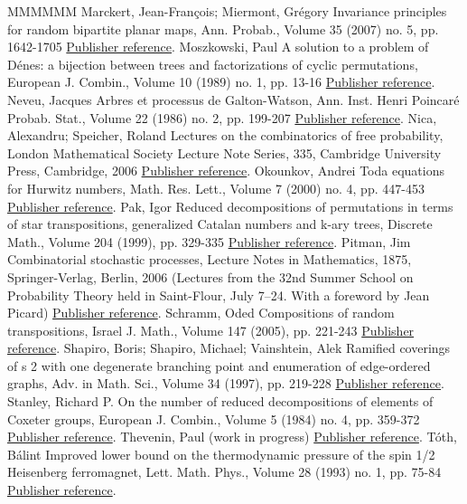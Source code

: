 \begin{thebibliography}{MMMMMM}
 Marckert, Jean-François; Miermont, Grégory Invariance principles for random bipartite planar maps, Ann. Probab., Volume 35 (2007) no. 5, pp. 1642-1705 \href{https://ahl.centre-mersenne.org/item/AHL_2018__1__149_0/#MM07}{Publisher reference}.
 Moszkowski, Paul A solution to a problem of Dénes: a bijection between trees and factorizations of cyclic permutations, European J. Combin., Volume 10 (1989) no. 1, pp. 13-16 \href{https://ahl.centre-mersenne.org/item/AHL_2018__1__149_0/#Mos89}{Publisher reference}.
 Neveu, Jacques Arbres et processus de Galton-Watson, Ann. Inst. Henri Poincaré Probab. Stat., Volume 22 (1986) no. 2, pp. 199-207 \href{https://ahl.centre-mersenne.org/item/AHL_2018__1__149_0/#Nev86}{Publisher reference}.
 Nica, Alexandru; Speicher, Roland Lectures on the combinatorics of free probability, London Mathematical Society Lecture Note Series, 335, Cambridge University Press, Cambridge, 2006 \href{https://ahl.centre-mersenne.org/item/AHL_2018__1__149_0/#NS06}{Publisher reference}.
 Okounkov, Andrei Toda equations for Hurwitz numbers, Math. Res. Lett., Volume 7 (2000) no. 4, pp. 447-453 \href{https://ahl.centre-mersenne.org/item/AHL_2018__1__149_0/#Oko00}{Publisher reference}.
 Pak, Igor Reduced decompositions of permutations in terms of star transpositions, generalized Catalan numbers and k-ary trees, Discrete Math., Volume 204 (1999), pp. 329-335 \href{https://ahl.centre-mersenne.org/item/AHL_2018__1__149_0/#Pak1999}{Publisher reference}.
 Pitman, Jim Combinatorial stochastic processes, Lecture Notes in Mathematics, 1875, Springer-Verlag, Berlin, 2006 (Lectures from the 32nd Summer School on Probability Theory held in Saint-Flour, July 7–24. With a foreword by Jean Picard) \href{https://ahl.centre-mersenne.org/item/AHL_2018__1__149_0/#Pit06}{Publisher reference}.
 Schramm, Oded Compositions of random transpositions, Israel J. Math., Volume 147 (2005), pp. 221-243 \href{https://ahl.centre-mersenne.org/item/AHL_2018__1__149_0/#Scr05}{Publisher reference}.
 Shapiro, Boris; Shapiro, Michael; Vainshtein, Alek Ramified coverings of s 2  with one degenerate branching point and enumeration of edge-ordered graphs, Adv. in Math. Sci., Volume 34 (1997), pp. 219-228 \href{https://ahl.centre-mersenne.org/item/AHL_2018__1__149_0/#SSV97}{Publisher reference}.
 Stanley, Richard P. On the number of reduced decompositions of elements of Coxeter groups, European J. Combin., Volume 5 (1984) no. 4, pp. 359-372 \href{https://ahl.centre-mersenne.org/item/AHL_2018__1__149_0/#Sta84}{Publisher reference}.
 Thevenin, Paul (work in progress) \href{https://ahl.centre-mersenne.org/item/AHL_2018__1__149_0/#Thev18}{Publisher reference}.
 Tóth, Bálint Improved lower bound on the thermodynamic pressure of the spin 1/2 Heisenberg ferromagnet, Lett. Math. Phys., Volume 28 (1993) no. 1, pp. 75-84 \href{https://ahl.centre-mersenne.org/item/AHL_2018__1__149_0/#Tot93}{Publisher reference}.
\end{thebibliography}
